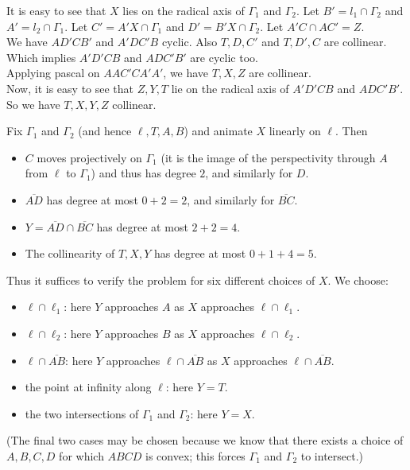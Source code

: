 \begin{solution} It is easy to see that $ X $ lies on the
    radical axis of $ \Gamma_1 $ and $ \Gamma_2 $. Let $ B' = l_1\cap \Gamma_2
    $ and $ A' = l_2\cap \Gamma_1 $. Let $ C'=A'X\cap \Gamma_1 $ and $
    D'=B'X\cap \Gamma_2 $. Let $ A'C\cap AC'=Z $.\\

    We have $ AD'CB' $ and $ A'DC'B $ cyclic. Also $ T, D, C' $ and $ T, D', C
    $ are collinear. Which implies $ A'D'CB $ and $ ADC'B' $ are cyclic too.\\

    Applying pascal on $ AAC'CA'A' $, we have $ T, X, Z $ are collinear.\\ 

    Now, it is easy to see that $ Z, Y, T $ lie on the radical axis of $
    A'D'CB $ and $ ADC'B' $. So we have $ T, X, Y, Z $ collinear.

 \end{solution}

\begin{solution} Fix $\Gamma_1$ and $\Gamma_2$
    (and hence $\ell, T, A, B$) and animate $X$ linearly on $\ell$. Then

    \begin{itemize} 
        \item $C$ moves projectively on $\Gamma_1$ (it is the
            image of the perspectivity through $A$ from $\ell$ to $\Gamma_1$) and
            thus has degree $2$, and similarly for $D$.  
        \item $\overline{AD}$ has
            degree at most $0+2=2$, and similarly for $\overline{BC}$.  
        \item $Y=\overline{AD}\cap\overline{BC}$ has degree at most $2+2=4.$ 
        \item The collinearity of $T,X,Y$ has degree at most $0+1+4=5.$ 
    \end{itemize}

    Thus it suffices to verify the problem for six different choices of $X$.
    We choose:

    \begin{itemize} 
        \item $\ell\cap \ell_1$: here $Y$ approaches $A$ as $X$
            approaches $\ell\cap \ell_1$.  
        \item $\ell\cap\ell_2$: here $Y$
            approaches $B$ as $X$ approaches $\ell\cap \ell_2$.  
        \item $\ell\cap \overline{AB}$: here $Y$ approaches $\ell\cap \overline{AB}$ as $X$
            approaches $\ell\cap \overline{AB}$.  
        \item the point at infinity along $\ell$: here $Y=T$.  
        \item the two intersections of $\Gamma_1$ and $\Gamma_2$: here $Y=X$.  
    \end{itemize}

    (The final two cases may be chosen because we know that there exists a
    choice of $A,B,C,D$ for which $ABCD$ is convex; this forces $\Gamma_1$ and
    $\Gamma_2$ to intersect.) 
\end{solution}


